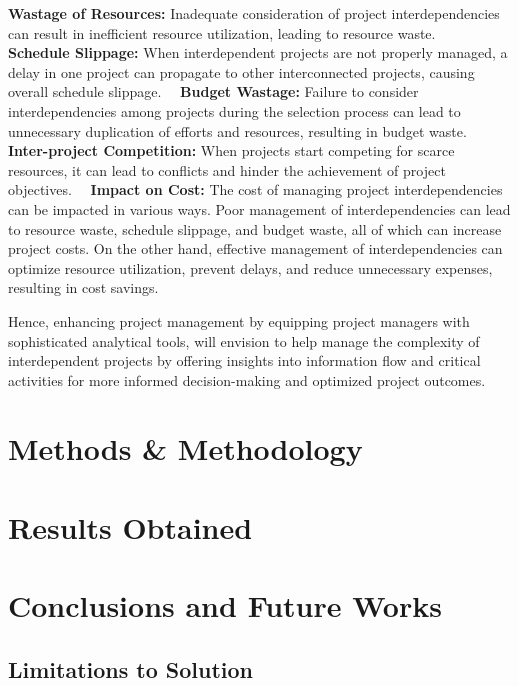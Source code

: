 \documentclass{llncs}
\begin{document}
\subitem \textbf{Wastage of Resources:} Inadequate consideration of project interdependencies can result in inefficient resource utilization, leading to resource waste.~\cite{refpaper2}~\cite{refpaper3}
\subitem \textbf{Schedule Slippage:} When interdependent projects are not properly managed, a delay in one project can propagate to other interconnected projects, causing overall schedule slippage.~\cite{refpaper2}~\cite{refpaper3}
\subitem \textbf{Budget Wastage:} Failure to consider interdependencies among projects during the selection process can lead to unnecessary duplication of efforts and resources, resulting in budget waste.~\cite{refpaper2}
\subitem\textbf{Inter-project Competition:} When projects start competing for scarce resources, it can lead to conflicts and hinder the achievement of project objectives.~\cite{refpaper2}~\cite{refpaper4}
\subitem\textbf{Impact on Cost:} The cost of managing project interdependencies can be impacted in various ways. Poor management of interdependencies can lead to resource waste, schedule slippage, and budget waste, all of which can increase project costs. On the other hand, effective management of interdependencies can optimize resource utilization, prevent delays, and reduce unnecessary expenses, resulting in cost savings.~\cite{refpaper2}

Hence, enhancing project management by equipping project managers with sophisticated analytical tools, will envision to help manage the complexity of interdependent projects by offering insights into information flow and critical activities for more informed decision-making and optimized project outcomes.~\cite{refpaper5}


\section{Methods \& Methodology}

\section{Results Obtained}

\section{Conclusions and Future Works}

\subsection{Limitations to Solution}
\end{document}
